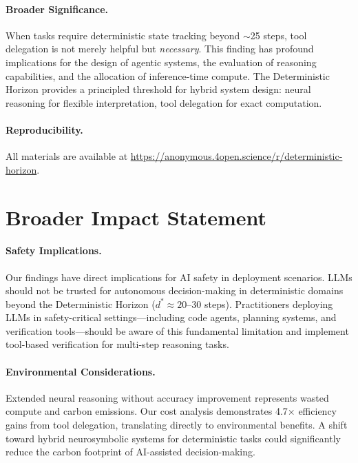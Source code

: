 \documentclass{article}
\theoremstyle{plain}
\theoremstyle{definition}
\theoremstyle{remark}
\begin{document}
\paragraph{Broader Significance.} When tasks require deterministic state tracking beyond $\sim$25 steps, tool delegation is not merely helpful but \emph{necessary}. This finding has profound implications for the design of agentic systems, the evaluation of reasoning capabilities, and the allocation of inference-time compute. The Deterministic Horizon provides a principled threshold for hybrid system design: neural reasoning for flexible interpretation, tool delegation for exact computation.

\paragraph{Reproducibility.} All materials are available at \url{https://anonymous.4open.science/r/deterministic-horizon}.


\section*{Broader Impact Statement}

\paragraph{Safety Implications.} Our findings have direct implications for AI safety in deployment scenarios. LLMs should not be trusted for autonomous decision-making in deterministic domains beyond the Deterministic Horizon ($d^* \approx 20$--30 steps). Practitioners deploying LLMs in safety-critical settings---including code agents, planning systems, and verification tools---should be aware of this fundamental limitation and implement tool-based verification for multi-step reasoning tasks.

\paragraph{Environmental Considerations.} Extended neural reasoning without accuracy improvement represents wasted compute and carbon emissions. Our cost analysis demonstrates 4.7$\times$ efficiency gains from tool delegation, translating directly to environmental benefits. A shift toward hybrid neurosymbolic systems for deterministic tasks could significantly reduce the carbon footprint of AI-assisted decision-making.
\end{document}
